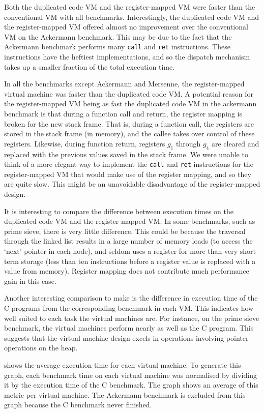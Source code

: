 		Both the duplicated code VM and the register-mapped VM were faster than the conventional VM with all benchmarks. Interestingly, the duplicated code VM and the register-mapped VM offered almost no improvement over the conventional VM on the Ackermann benchmark. This may be due to the fact that the Ackermann benchmark performs many \texttt{call} and \texttt{ret} instructions. These instructions have the heftiest implementations, and so the dispatch mechanism takes up a smaller fraction of the total execution time. 
		
		In all the benchmarks except Ackermann and Mersenne, the register-mapped virtual machine was faster than the duplicated code VM. A potential reason for the register-mapped VM being as fast the duplicated code VM in the ackermann benchmark is that during a function call and return, the register mapping is broken for the new stack frame. That is, during a function call, the registers are stored in the stack frame (in memory), and the callee takes over control of these registers. Likewise, during function return, registers $g_1$ through $g_4$ are cleared and replaced with the previous values saved in the stack frame. We were unable to think of a more elegant way to implement the \texttt{call} and \texttt{ret} instructions for the register-mapped VM that would make use of the register mapping, and so they are quite slow. This might be an unavoidable disadvantage of the register-mapped design.
		
		It is interesting to compare the difference between execution times on the duplicated code VM and the register-mapped VM. In some benchmarks, such as prime sieve, there is very little difference. This could be because the traversal through the linked list results in a large number of memory loads (to access the `next' pointer in each node), and seldom uses a register for more than very short-term storage (less than ten instructions before a register value is replaced with a value from memory). Register mapping does not contribute much performance gain in this case.
		
		Another interesting comparison to make is the difference in execution time of the C programs from the corresponding benchmark in each VM. This indicates how well suited to each task the virtual machines are. For instance, on the prime sieve benchmark, the virtual machines perform nearly as well as the C program. This suggests that the virtual machine design excels in operations involving pointer operations on the heap.
		
		 shows the average execution time for each virtual machine. To generate this graph, each benchmark time on each virtual machine was normalised by dividing it by the execution time of the C benchmark. The graph shows an average of this metric per virtual machine. The Ackermann benchmark is excluded from this graph because the C benchmark never finished. 
		
